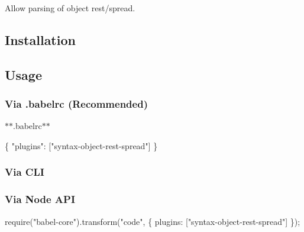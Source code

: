 Allow parsing of object rest/spread.

\subsection*{Installation}




\subsection*{Usage}

\subsubsection*{Via {\ttfamily .babelrc} (Recommended)}

$\ast$$\ast$.babelrc$\ast$$\ast$


\begin{DoxyCode}
\{
  "plugins": ["syntax-object-rest-spread"]
\}
\end{DoxyCode}


\subsubsection*{Via C\+LI}




\subsubsection*{Via Node A\+PI}


\begin{DoxyCode}
require("babel-core").transform("code", \{
  plugins: ["syntax-object-rest-spread"]
\});
\end{DoxyCode}
 